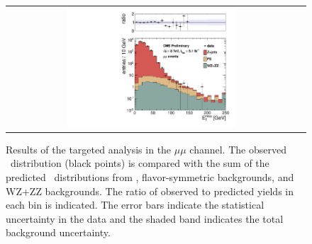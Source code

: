 \clearpage

\begin{figure}[!h]
\begin{center}
\begin{tabular}{cc}
\includegraphics[width=0.6\textwidth]{plots/met_bveto_2.pdf}
\end{tabular}
\caption{Results of the targeted analysis in the $\mu\mu$ channel. The observed \MET\ distribution (black points) is compared with the sum of the predicted \MET\
distributions from \zjets, flavor-symmetric backgrounds, and WZ+ZZ backgrounds. The ratio of observed to predicted yields in each bin is
indicated. The error bars indicate the statistical uncertainty in the data and the shaded band indicates the total background uncertainty.
\label{fig:results_targ_mm}
}
\end{center}
\end{figure}



